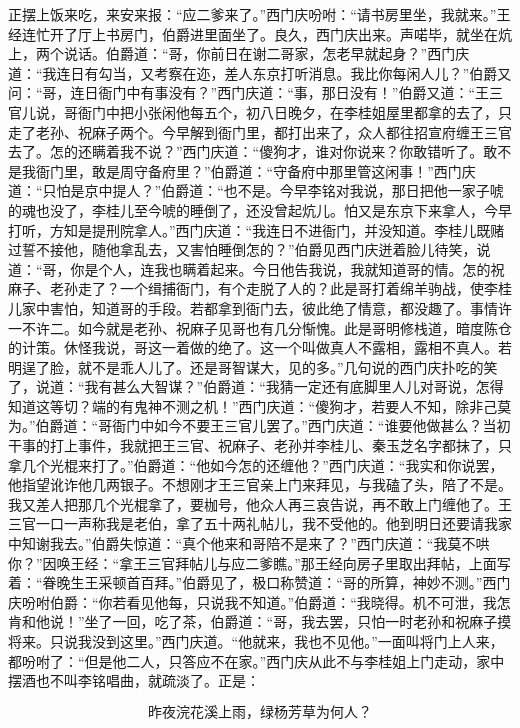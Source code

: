 正摆上饭来吃，来安来报：“应二爹来了。”西门庆吩咐：“请书房里坐，我就来。”王经连忙开了厅上书房门，伯爵进里面坐了。良久，西门庆出来。声喏毕，就坐在炕上，两个说话。伯爵道：“哥，你前日在谢二哥家，怎老早就起身？”西门庆道：“我连日有勾当，又考察在迩，差人东京打听消息。我比你每闲人儿？”伯爵又问：“哥，连日衙门中有事没有？”西门庆道：“事，那日没有！”伯爵又道：“王三官儿说，哥衙门中把小张闲他每五个，初八日晚夕，在李桂姐屋里都拿的去了，只走了老孙、祝麻子两个。今早解到衙门里，都打出来了，众人都往招宣府缠王三官去了。怎的还瞒着我不说？”西门庆道：“傻狗才，谁对你说来？你敢错听了。敢不是我衙门里，敢是周守备府里？”伯爵道：“守备府中那里管这闲事！”西门庆道：“只怕是京中提人？”伯爵道：“也不是。今早李铭对我说，那日把他一家子唬的魂也没了，李桂儿至今唬的睡倒了，还没曾起炕儿。怕又是东京下来拿人，今早打听，方知是提刑院拿人。”西门庆道：“我连日不进衙门，并没知道。李桂儿既赌过誓不接他，随他拿乱去，又害怕睡倒怎的？”伯爵见西门庆迸着脸儿待笑，说道：“哥，你是个人，连我也瞒着起来。今日他告我说，我就知道哥的情。怎的祝麻子、老孙走了？一个缉捕衙门，有个走脱了人的？此是哥打着绵羊驹战，使李桂儿家中害怕，知道哥的手段。若都拿到衙门去，彼此绝了情意，都没趣了。事情许一不许二。如今就是老孙、祝麻子见哥也有几分惭愧。此是哥明修栈道，暗度陈仓的计策。休怪我说，哥这一着做的绝了。这一个叫做真人不露相，露相不真人。若明逞了脸，就不是乖人儿了。还是哥智谋大，见的多。”几句说的西门庆扑吃的笑了，说道：“我有甚么大智谋？”伯爵道：“我猜一定还有底脚里人儿对哥说，怎得知道这等切？端的有鬼神不测之机！”西门庆道：“傻狗才，若要人不知，除非己莫为。”伯爵道：“哥衙门中如今不要王三官儿罢了。”西门庆道：“谁要他做甚么？当初干事的打上事件，我就把王三官、祝麻子、老孙并李桂儿、秦玉芝名字都抹了，只拿几个光棍来打了。”伯爵道：“他如今怎的还缠他？”西门庆道：“我实和你说罢，他指望讹诈他几两银子。不想刚才王三官亲上门来拜见，与我磕了头，陪了不是。我又差人把那几个光棍拿了，要枷号，他众人再三哀告说，再不敢上门缠他了。王三官一口一声称我是老伯，拿了五十两礼帖儿，我不受他的。他到明日还要请我家中知谢我去。”伯爵失惊道：“真个他来和哥陪不是来了？”西门庆道：“我莫不哄你？”因唤王经：“拿王三官拜帖儿与应二爹瞧。”那王经向房子里取出拜帖，上面写着：“眷晚生王采顿首百拜。”伯爵见了，极口称赞道：“哥的所算，神妙不测。”西门庆吩咐伯爵：“你若看见他每，只说我不知道。”伯爵道：“我晓得。机不可泄，我怎肯和他说！”坐了一回，吃了茶，伯爵道：“哥，我去罢，只怕一时老孙和祝麻子摸将来。只说我没到这里。”西门庆道。“他就来，我也不见他。”一面叫将门上人来，都吩咐了：“但是他二人，只答应不在家。”西门庆从此不与李桂姐上门走动，家中摆酒也不叫李铭唱曲，就疏淡了。正是：

\[
昨夜浣花溪上雨，绿杨芳草为何人？
\]
